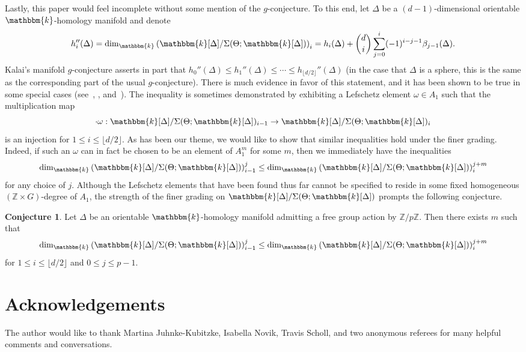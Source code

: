 \documentclass[10pt]{amsart}
\theoremstyle{definition}
\newcommand{\longthanks}[1]{\section*{Acknowledgements}#1}
\newtheorem{conjecture}[theo]{Conjecture}
\newcommand{\field}{\mathbbm{k}}
\newcommand{\ZZ}{{\mathbb Z}}
\begin{document}
Lastly, this paper would feel incomplete without some mention of the $g$-conjecture. To this end, let $\Delta$ be a $(d-1)$-dimensional orientable $\field$-homology manifold and denote
\[
h_i''(\Delta)=\dim_\field \left(\field[\Delta]/\Sigma(\Theta;\field[\Delta])\right)_i=h_i(\Delta)+\binom{d}{i}\sum_{j=0}^i(-1)^{i-j-1}\beta_{j-1}(\Delta).
\]
Kalai's manifold $g$-conjecture asserts in part that $h_0''(\Delta)\le h_1''(\Delta)\le \cdots \le h_{\lfloor d/2\rfloor}''(\Delta)$ (in the case that $\Delta$ is a sphere, this is the same as the corresponding part of the usual $g$-conjecture). There is much evidence in favor of this statement, and it has been shown to be true in some special cases (see~\cite[Theorem~5.3]{Tight}, \cite[Theorem~1.5]{FaceNumbers}, and~\cite[Theorem~1.6]{NS-Gorenstein}). The inequality is sometimes demonstrated by exhibiting a Lefschetz element $\omega\in A_1$ such that the multiplication map
\[
\cdot\omega:\field[\Delta]/\Sigma(\Theta;\field[\Delta])_{i-1}\to\field[\Delta]/\Sigma(\Theta;\field[\Delta])_{i}
\]
is an injection for $1\le i\le \lfloor d/2\rfloor$. As has been our theme, we would like to show that similar inequalities hold under the finer grading. Indeed, if such an $\omega$ can in fact be chosen to be an element of $A_1^m$ for some $m$, then we immediately have the inequalities
\[
\dim_\field \left(\field[\Delta]/\Sigma(\Theta;\field[\Delta])\right)_{i-1}^j\le \dim_\field \left(\field[\Delta]/\Sigma(\Theta;\field[\Delta])\right)_i^{j+m}
\]
for any choice of $j$. Although the Lefschetz elements that have been found thus far cannot be specified to reside in some fixed homogeneous $(\ZZ\times G)$-degree of $A_1$, the strength of the finer grading on $\field[\Delta]/\Sigma(\Theta;\field[\Delta])$ prompts the following conjecture.

\begin{conjecture}
Let $\Delta$ be an orientable $\field$-homology manifold admitting a free group action by $\ZZ/p\ZZ$. Then there exists $m$ such that
\[
\dim_\field \left(\field[\Delta]/\Sigma(\Theta;\field[\Delta])\right)_{i-1}^j\le \dim_\field \left(\field[\Delta]/\Sigma(\Theta;\field[\Delta])\right)_i^{j+m}
\]
for $1\le i\le \lfloor d/2\rfloor$ and $0\le j\le p-1$.
\end{conjecture}

\longthanks The author would like to thank Martina Juhnke-Kubitzke, Isabella Novik, Travis Scholl, and two anonymous referees for many helpful comments and conversations.
\end{document}
